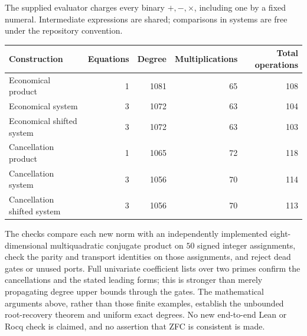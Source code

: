 The supplied evaluator charges every binary $+,-,\times$, including one
by a fixed numeral.  Intermediate expressions are shared; comparisons
in systems are free under the repository convention.
\begin{center}
\begin{tabular}{lrrrr}
\hline
Construction & Equations & Degree & Multiplications & Total operations\\
\hline
Economical product &1&1081&65&108\\
Economical system &3&1072&63&104\\
Economical shifted system &3&1072&63&103\\
Cancellation product &1&1065&72&118\\
Cancellation system &3&1056&70&114\\
Cancellation shifted system &3&1056&70&113\\
\hline
\end{tabular}
\end{center}
The checks compare each new norm with an independently implemented
eight-dimensional multiquadratic conjugate product on $50$ signed integer
assignments, check the parity and transport identities on those assignments,
and reject dead gates or unused ports.  Full univariate coefficient lists
over two primes confirm the cancellations and the stated leading forms;
this is stronger than merely propagating degree upper bounds through the
gates.  The mathematical arguments above, rather than those finite
examples, establish the unbounded root-recovery theorem and uniform exact
degrees.  No new end-to-end Lean or Rocq check is claimed, and no assertion
that ZFC is consistent is made.

